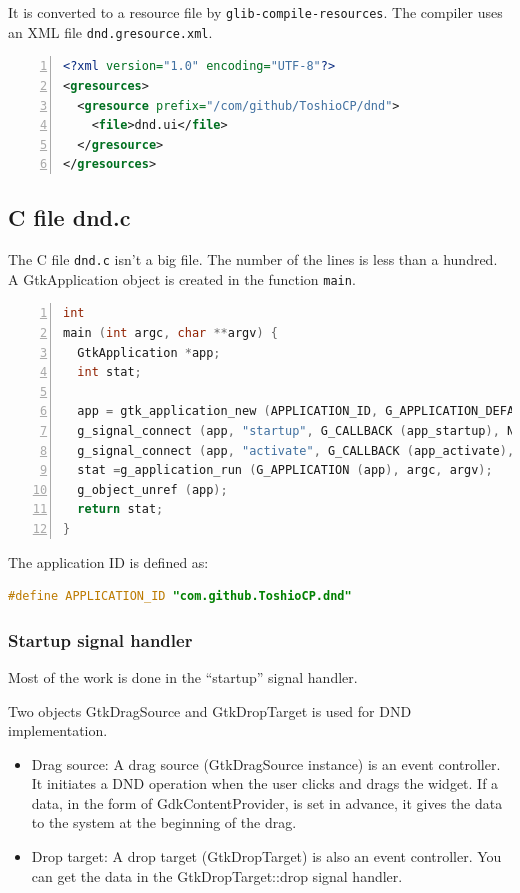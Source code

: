 It is converted to a resource file by
\passthrough{\lstinline!glib-compile-resources!}. The compiler uses an
XML file \passthrough{\lstinline!dnd.gresource.xml!}.

\begin{lstlisting}[language=XML, numbers=left]
<?xml version="1.0" encoding="UTF-8"?>
<gresources>
  <gresource prefix="/com/github/ToshioCP/dnd">
    <file>dnd.ui</file>
  </gresource>
</gresources>
\end{lstlisting}

\subsection{C file dnd.c}\label{c-file-dnd.c}

The C file \passthrough{\lstinline!dnd.c!} isn't a big file. The number
of the lines is less than a hundred. A GtkApplication object is created
in the function \passthrough{\lstinline!main!}.

\begin{lstlisting}[language=C, numbers=left]
int
main (int argc, char **argv) {
  GtkApplication *app;
  int stat;

  app = gtk_application_new (APPLICATION_ID, G_APPLICATION_DEFAULT_FLAGS);
  g_signal_connect (app, "startup", G_CALLBACK (app_startup), NULL);
  g_signal_connect (app, "activate", G_CALLBACK (app_activate), NULL);
  stat =g_application_run (G_APPLICATION (app), argc, argv);
  g_object_unref (app);
  return stat;
}
\end{lstlisting}

The application ID is defined as:

\begin{lstlisting}[language=C]
#define APPLICATION_ID "com.github.ToshioCP.dnd"
\end{lstlisting}

\subsubsection{Startup signal handler}\label{startup-signal-handler}

Most of the work is done in the ``startup'' signal handler.

Two objects GtkDragSource and GtkDropTarget is used for DND
implementation.

\begin{itemize}
\tightlist
\item
  Drag source: A drag source (GtkDragSource instance) is an event
  controller. It initiates a DND operation when the user clicks and
  drags the widget. If a data, in the form of GdkContentProvider, is set
  in advance, it gives the data to the system at the beginning of the
  drag.
\item
  Drop target: A drop target (GtkDropTarget) is also an event
  controller. You can get the data in the GtkDropTarget::drop signal
  handler.
\end{itemize}

